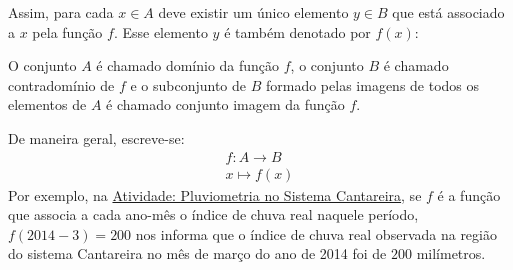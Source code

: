Assim, para cada \(x\in A\) deve existir um único elemento \(y\in B\) que está associado a \(x\) pela função \(f\). Esse elemento \(y\) é também denotado por \(f(x)\):

\begin{figure}[H]
\centering


\end{figure}

O conjunto \(A\) é chamado domínio da função \(f\), o conjunto \(B\) é chamado contradomínio de \(f\) e o subconjunto de \(B\) formado pelas imagens de todos os elementos de \(A\) é chamado conjunto imagem da função \(f\).

\begin{figure}[H]
\centering


\end{figure}
De maneira geral, escreve-se:
\begin{equation*}
\begin{split}f:A \to B \\
x \mapsto f(x)\end{split}
\end{equation*}
Por exemplo, na {\hyperref[\detokenize{AF106-0:ativ-funcoes-pluviometria}]{Atividade: Pluviometria no Sistema Cantareira}}, se \(f\) é a função que associa a cada ano-mês o índice de chuva real naquele período, \(f(2014-3)=200\) nos informa que o índice de chuva real observada na região do sistema Cantareira no mês de março do ano de 2014 foi de \(200\) milímetros.

